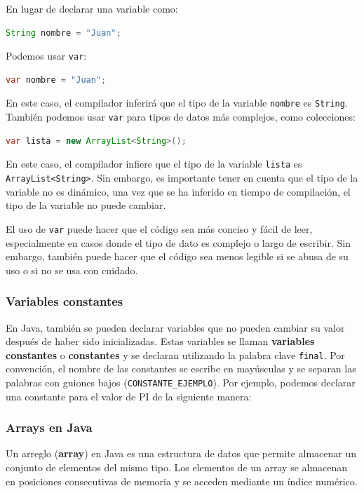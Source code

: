 \documentclass[executivepaper]{article}
\begin{document}
En lugar de declarar una variable como:

\begin{lstlisting}[language=Java]
String nombre = "Juan";
\end{lstlisting}

Podemos usar \texttt{var}:

\begin{lstlisting}[language=Java]
var nombre = "Juan";
\end{lstlisting}

En este caso, el compilador inferirá que el tipo de la variable \texttt{nombre} es \texttt{String}. También podemos usar \texttt{var} para tipos de datos más complejos, como colecciones:

\begin{lstlisting}[language=Java]
var lista = new ArrayList<String>();
\end{lstlisting}

En este caso, el compilador infiere que el tipo de la variable \texttt{lista} es \texttt{ArrayList<String>}. Sin embargo, es importante tener en cuenta que el tipo de la variable no es dinámico, una vez que se ha inferido en tiempo de compilación, el tipo de la variable no puede cambiar.

El uso de \texttt{var} puede hacer que el código sea más conciso y fácil de leer, especialmente en casos donde el tipo de dato es complejo o largo de escribir. Sin embargo, también puede hacer que el código sea menos legible si se abusa de su uso o si no se usa con cuidado.

\subsubsection*{Variables constantes}
En Java, también se pueden declarar variables que no pueden cambiar su valor después de haber sido inicializadas. Estas variables se llaman \textbf{variables constantes} o \textbf{constantes} y se declaran utilizando la palabra clave \lstinline{final}.
Por convención, el nombre de las constantes se escribe en mayúsculas y se separan las palabras con guiones bajos (\lstinline{CONSTANTE_EJEMPLO}).
Por ejemplo, podemos declarar una constante para el valor de PI de la siguiente manera:

\subsubsection{Arrays en Java}

Un arreglo (\textbf{array}) en Java es una estructura de datos que permite almacenar un conjunto de elementos del mismo tipo. Los elementos de un array se almacenan en posiciones consecutivas de memoria y se acceden mediante un índice numérico.
\end{document}
